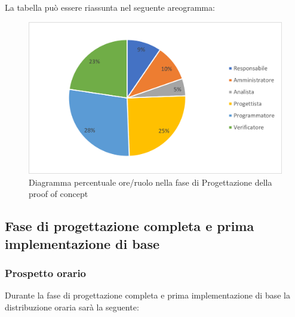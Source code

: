 La tabella può essere riassunta nel seguente areogramma:
\begin{figure}[H]
	\centering
	\includegraphics[width=0.8\linewidth]{res/images/preventivo/4-2.png}
	\caption{Diagramma percentuale ore/ruolo nella fase di Progettazione della proof of concept}
	\label{fig:diagramma costi ruolo fase progettazione della proof of concept}
\end{figure}

\subsection{Fase di progettazione completa e prima implementazione di base}
\subsubsection{Prospetto orario}
Durante la fase di progettazione completa e prima implementazione di base la distribuzione oraria sarà la seguente:

